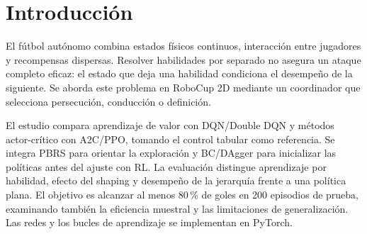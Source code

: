 \section{Introducción}
El fútbol autónomo combina estados físicos continuos, interacción entre jugadores
y recompensas dispersas. Resolver habilidades por separado no asegura un ataque
completo eficaz: el estado que deja una habilidad condiciona el desempeño de la
siguiente. Se aborda este problema en RoboCup 2D mediante un coordinador que
selecciona persecución, conducción o definición.

El estudio compara aprendizaje de valor con DQN/Double DQN y métodos actor-crítico
con A2C/PPO, tomando el control tabular como referencia. Se integra PBRS para
orientar la exploración y BC/DAgger para inicializar las políticas antes del
ajuste con RL. La evaluación distingue aprendizaje por habilidad, efecto del
shaping y desempeño de la jerarquía frente a una política plana. El objetivo es
alcanzar al menos 80\,\% de goles en 200 episodios de prueba, examinando también
la eficiencia muestral y las limitaciones de generalización. Las redes y los
bucles de aprendizaje se implementan en PyTorch.
